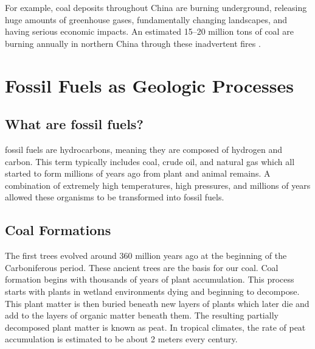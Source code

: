 For example, coal deposits throughout China are burning underground, releasing huge amounts of greenhouse gases, fundamentally changing landscapes, and having serious economic impacts. An estimated 15--20 million tons of coal are burning annually in northern China through these inadvertent fires \citep{kuenzer2007uncontrolled}.



\section{Fossil Fuels as Geologic Processes}

\subsection{What are fossil fuels?}

\Gls{fossil fuels} are hydrocarbons, meaning they are composed of hydrogen and carbon. This term typically includes coal, crude oil, and natural gas which all started to form millions of years ago from plant and animal remains. A combination of extremely high temperatures, high pressures, and millions of years allowed these organisms to be transformed into fossil fuels. 

\subsection{Coal Formations}

The first trees evolved around 360 million years ago at the beginning of the Carboniferous period. These ancient trees are the basis for our coal. Coal formation begins with thousands of years of plant accumulation. This process starts with plants in wetland environments dying and beginning to decompose. 
This plant matter is then buried beneath new layers of plants which later die and add to the layers of organic matter beneath them. The resulting partially decomposed plant matter is known as \gls{peat}. In tropical climates, the rate of peat accumulation is estimated to be about 2 meters every century.

